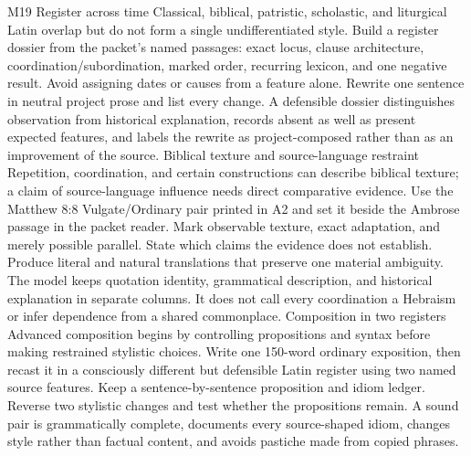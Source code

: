 \begin{courseunit}{M19}
\SubmoduleExtension
  {Register across time}
  {Classical, biblical, patristic, scholastic, and liturgical Latin overlap but
  do not form a single undifferentiated style.}
  {Build a register dossier from the packet's named passages: exact locus,
  clause architecture, coordination/subordination, marked order, recurring
  lexicon, and one negative result.  Avoid assigning dates or causes from a
  feature alone.}
  {Rewrite one sentence in neutral project prose and list every change.}
  {A defensible dossier distinguishes observation from historical explanation,
  records absent as well as present expected features, and labels the rewrite
  as project-composed rather than as an improvement of the source.}
\SubmoduleExtension
  {Biblical texture and source-language restraint}
  {Repetition, coordination, and certain constructions can describe biblical
  texture; a claim of source-language influence needs direct comparative
  evidence.}
  {Use the Matthew 8:8 Vulgate/Ordinary pair printed in A2 and set it beside
  the Ambrose passage in the packet reader.  Mark observable texture, exact
  adaptation, and merely possible parallel.  State which claims the evidence
  does not establish.}
  {Produce literal and natural translations that preserve one material
  ambiguity.}
  {The model keeps quotation identity, grammatical description, and historical
  explanation in separate columns.  It does not call every coordination a
  Hebraism or infer dependence from a shared commonplace.}
\SubmoduleExtension
  {Composition in two registers}
  {Advanced composition begins by controlling propositions and syntax before
  making restrained stylistic choices.}
  {Write one 150-word ordinary exposition, then recast it in a consciously
  different but defensible Latin register using two named source features.
  Keep a sentence-by-sentence proposition and idiom ledger.}
  {Reverse two stylistic changes and test whether the propositions remain.}
  {A sound pair is grammatically complete, documents every source-shaped idiom,
  changes style rather than factual content, and avoids pastiche made from
  copied phrases.}
\end{courseunit}

